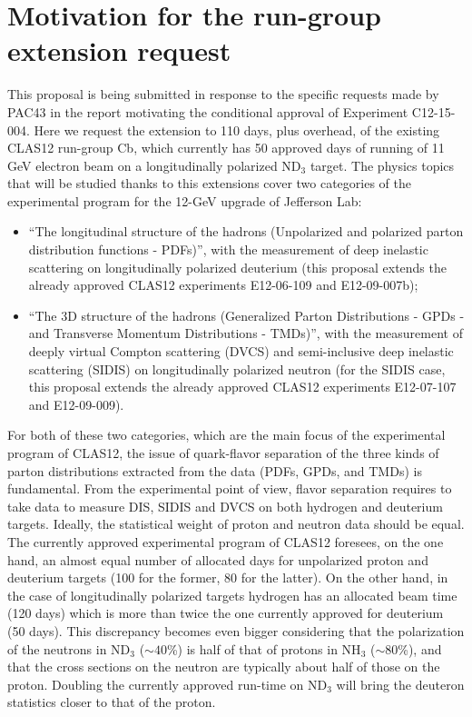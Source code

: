 \section{Motivation for the run-group extension request}
This proposal is being submitted in response to the specific requests made by PAC43 in the report motivating the conditional approval of Experiment C12-15-004. 
Here we request the extension to 110 days, plus overhead, of the existing CLAS12 run-group Cb, which currently has 50 approved days of running of 11 GeV electron beam on a longitudinally polarized ND$_3$ target. 
The physics topics that will be studied thanks to this extensions cover two categories of the experimental program for the 12-GeV upgrade of Jefferson Lab: 
\begin{itemize}
\item{``The longitudinal structure of the hadrons (Unpolarized and polarized parton distribution functions - PDFs)'', with the measurement of deep inelastic scattering on longitudinally polarized deuterium (this proposal extends the already approved CLAS12 experiments E12-06-109 and E12-09-007b);}
\item{``The 3D structure of the hadrons (Generalized Parton Distributions - GPDs - and Transverse Momentum Distributions - TMDs)'', with the measurement of deeply virtual Compton scattering (DVCS) and semi-inclusive deep inelastic scattering (SIDIS) on longitudinally polarized neutron (for the SIDIS case, this proposal extends the already approved CLAS12 experiments E12-07-107 and E12-09-009).}
\end{itemize}
For both of these two categories, which are the main focus of the experimental program of CLAS12, the issue of quark-flavor separation of the three kinds of parton distributions extracted from the data (PDFs, GPDs, and TMDs) is fundamental. From the experimental point of view, flavor separation requires to take data to measure DIS, SIDIS and DVCS on both hydrogen and deuterium targets. Ideally, the statistical weight of proton and neutron data should be equal. The currently approved experimental program of CLAS12 foresees, on the one hand, an almost equal number of allocated days for unpolarized proton and deuterium targets (100 for the former, 80 for the latter). On the other hand, in the case of longitudinally polarized targets hydrogen has an allocated beam time (120 days) which is more than twice the one currently approved for deuterium (50 days). This discrepancy becomes even bigger considering that the polarization of the neutrons in ND$_3$ ($\sim 40$\%) is half of that of protons in NH$_3$ ($\sim 80$\%), and that the cross sections on the neutron are typically about half of those on the proton. Doubling the currently approved run-time on ND$_3$ will bring the deuteron statistics closer to that of the proton. 

